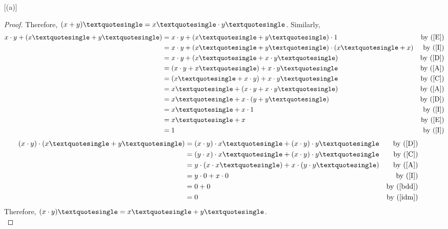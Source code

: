\begin{enumerate} [(a)]
\begin{proof}
			Therefore, $(x+y)\textquotesingle=x\textquotesingle\cdot y\textquotesingle$. Similarly,
			\begin{align*}
				x\cdot y + (x\textquotesingle+ y\textquotesingle) &= x\cdot y + (x\textquotesingle+ y\textquotesingle)\cdot1 &\text{by (\ref{E})}\\
				&= x\cdot y + (x\textquotesingle+ y\textquotesingle)\cdot(x\textquotesingle + x) &\text{by (\ref{I})}\\
				&= x\cdot y + (x\textquotesingle+ x\cdot y\textquotesingle) &\text{by (\ref{D})}\\
				&= (x\cdot y + x\textquotesingle)+ x\cdot y\textquotesingle &\text{by (\ref{A})}\\
				&= (x\textquotesingle + x\cdot y)+ x\cdot y\textquotesingle &\text{by (\ref{C})}\\
				&= x\textquotesingle + (x\cdot y + x\cdot y\textquotesingle) &\text{by (\ref{A})}\\
				&= x\textquotesingle + x\cdot(y + y\textquotesingle) &\text{by (\ref{D})}\\
				&= x\textquotesingle + x\cdot1 &\text{by (\ref{I})}\\
				&= x\textquotesingle + x &\text{by (\ref{E})}\\
				&= 1 &\text{by (\ref{I})}
			\end{align*}
			\begin{align*}
				(x\cdot y)\cdot (x\textquotesingle+ y\textquotesingle) &= (x\cdot y)\cdot x\textquotesingle + (x\cdot y)\cdot y\textquotesingle &\text{by (\ref{D})}\\
				&= (y\cdot x)\cdot x\textquotesingle + (x\cdot y)\cdot y\textquotesingle &\text{by (\ref{C})}\\
				&= y\cdot (x\cdot x\textquotesingle) + x\cdot (y\cdot y\textquotesingle) &\text{by (\ref{A})}\\
				&= y\cdot 0 + x\cdot 0 &\text{by (\ref{I})}\\
				&= 0 + 0 &\text{by (\ref{bdd})}\\
				&= 0 &\text{by (\ref{idm})}
			\end{align*}
			Therefore, $(x\cdot y)\textquotesingle=x\textquotesingle+ y\textquotesingle$.\\
		\end{proof}
	\end{enumerate}